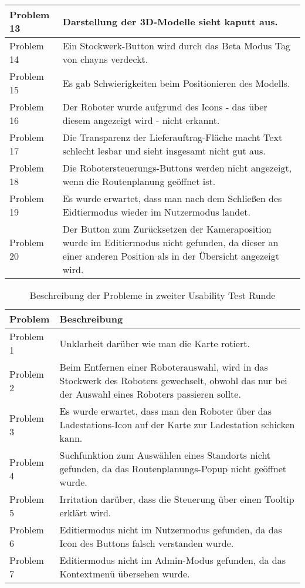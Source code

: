\begin{table}[H]
\begin{tabular}{l|l}
        Problem 13  & \multicolumn{1}{p{12cm}}{Darstellung der 3D-Modelle sieht kaputt aus.} \\ \hline
        Problem 14  & \multicolumn{1}{p{12cm}}{Ein Stockwerk-Button wird durch das Beta Modus Tag von chayns verdeckt.} \\ \hline
        Problem 15  & \multicolumn{1}{p{12cm}}{Es gab Schwierigkeiten beim Positionieren des Modells.} \\ \hline
        Problem 16  & \multicolumn{1}{p{12cm}}{Der Roboter wurde aufgrund des Icons - das über diesem angezeigt wird - nicht erkannt.} \\ \hline
        Problem 17  & \multicolumn{1}{p{12cm}}{Die Transparenz der Lieferauftrag-Fläche macht Text schlecht lesbar und sieht insgesamt nicht gut aus.} \\ \hline
        Problem 18  & \multicolumn{1}{p{12cm}}{Die Robotersteuerungs-Buttons werden nicht angezeigt, wenn die Routenplanung geöffnet ist.} \\ \hline
        Problem 19  & \multicolumn{1}{p{12cm}}{Es wurde erwartet, dass man nach dem Schließen des Eidtiermodus wieder im Nutzermodus landet.} \\ \hline
        Problem 20  & \multicolumn{1}{p{12cm}}{Der Button zum Zurücksetzen der Kameraposition wurde im Editiermodus nicht gefunden, da dieser an einer anderen Position als in der Übersicht angezeigt wird.} \\
    \end{tabular}
\end{table}
\begin{table}[H]
    \caption{Beschreibung der Probleme in zweiter Usability Test Runde}\label{tbl:2ndUsabilityTestsProblemsDesc}
    \begin{tabular}{l|l}
        Problem     & Beschreibung \\ \hline
        Problem 1   & \multicolumn{1}{p{12cm}}{Unklarheit darüber wie man die Karte rotiert.} \\ \hline
        Problem 2   & \multicolumn{1}{p{12cm}}{Beim Entfernen einer Roboterauswahl, wird in das Stockwerk des Roboters gewechselt, obwohl das nur bei der Auswahl eines Roboters passieren sollte.} \\ \hline
        Problem 3   & \multicolumn{1}{p{12cm}}{Es wurde erwartet, dass man den Roboter über das Ladestations-Icon auf der Karte zur Ladestation schicken kann.} \\ \hline
        Problem 4   & \multicolumn{1}{p{12cm}}{Suchfunktion zum Auswählen eines Standorts nicht gefunden, da das Routenplanungs-Popup nicht geöffnet wurde.} \\ \hline
        Problem 5   & \multicolumn{1}{p{12cm}}{Irritation darüber, dass die Steuerung über einen Tooltip erklärt wird.} \\ \hline
        Problem 6   & \multicolumn{1}{p{12cm}}{Editiermodus nicht im Nutzermodus gefunden, da das Icon des Buttons falsch verstanden wurde.} \\ \hline
        Problem 7   & \multicolumn{1}{p{12cm}}{Editiermodus nicht im Admin-Modus gefunden, da das Kontextmenü übersehen wurde.}
    \end{tabular}
\end{table}
